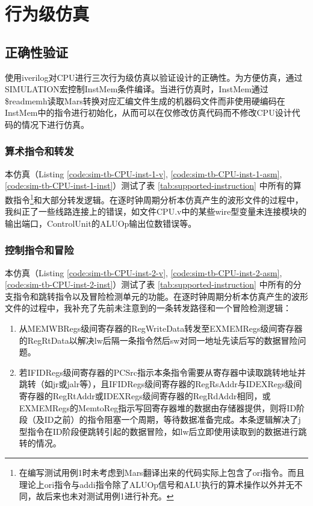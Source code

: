 \section{行为级仿真}

\subsection{正确性验证}
\label{subsec:behavioral-simulation}
使用iverilog对CPU进行三次行为级仿真以验证设计的正确性。为方便仿真，通过SIMULATION宏控制InstMem条件编译。当进行仿真时，InstMem通过\$readmemh读取Mars转换对应汇编文件生成的机器码文件而非使用硬编码在InstMem中的指令进行初始化，从而可以在仅修改仿真代码而不修改CPU设计代码的情况下进行仿真。

\subsubsection{算术指令和转发}
\label{subsubsec:sim-arithmetic-instructions}
本仿真（Listing \ref{code:sim-tb-CPU-inst-1-v}, \ref{code:sim-tb-CPU-inst-1-asm}, \ref{code:sim-tb-CPU-inst-1-inst}）测试了表 \ref{tab:supported-instruction} 中所有的算数指令\footnote{在编写测试用例1时未考虑到Mars翻译出来的代码实际上包含了ori指令。而且理论上ori指令与addi指令除了ALUOp信号和ALU执行的算术操作以外并无不同，故后来也未对测试用例1进行补充。}和大部分转发逻辑。在逐时钟周期分析本仿真产生的波形文件的过程中，我纠正了一些线路连接上的错误，如文件CPU.v中的某些wire型变量未连接模块的输出端口，ControlUnit的ALUOp输出位数错误等。

\subsubsection{控制指令和冒险}
\label{subsubsec:sim-control-instructions}
本仿真（Listing \ref{code:sim-tb-CPU-inst-2-v}, \ref{code:sim-tb-CPU-inst-2-asm}, \ref{code:sim-tb-CPU-inst-2-inst}）测试了表 \ref{tab:supported-instruction} 中所有的分支指令和跳转指令以及冒险检测单元的功能。在逐时钟周期分析本仿真产生的波形文件的过程中，我补充了先前未注意到的一条转发路径和一个冒险检测逻辑：
\begin{enumerate}
    \item 从MEMWBRegs级间寄存器的RegWriteData转发至EXMEMRegs级间寄存器的RegRtData以解决lw后隔一条指令然后sw对同一地址先读后写的数据冒险问题。
    \item 若IFIDRegs级间寄存器的PCSrc指示本条指令需要从寄存器中读取跳转地址并跳转（如jr或jalr等），且IFIDRegs级间寄存器的RegRsAddr与IDEXRegs级间寄存器的RegRtAddr或IDEXRegs级间寄存器的RegRdAddr相同，或EXMEMRegs的MemtoReg指示写回寄存器堆的数据由存储器提供，则将ID阶段（及ID之前）的指令阻塞一个周期，等待数据准备完成。本条逻辑解决了j型指令在ID阶段便跳转引起的数据冒险，如lw后立即使用读取到的数据进行跳转的情况。
\end{enumerate}


